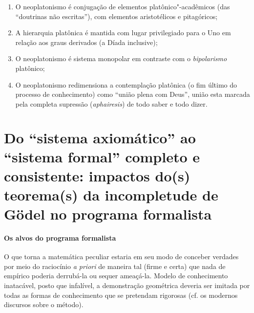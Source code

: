 {\begin{enumerate}
\item O neoplatonismo é conjugação de elementos
platônico"-acadêmicos (das “doutrinas não escritas”), com
elementos aristotélicos e pitagóricos;

\item A hierarquia platônica é mantida com lugar privilegiado para o
Uno em relação aos graus derivados (a Díada inclusive);

\item O neoplatonismo é sistema monopolar em contraste com o
\emph{bipolarismo} platônico;

\item O neoplatonismo redimensiona a contemplação platônica (o fim
último do processo de conhecimento) como “união plena com Deus”,
união esta marcada pela completa supressão (\emph{aphairesis})
de todo saber e todo dizer.
\end{enumerate}

\section{Do ``sistema
axiomático'' ao ``sistema
formal'' completo e consistente: impactos do(s)
teorema(s) da incompletude de Gödel no programa formalista}

\medskip\paragraph{Os alvos do programa formalista}

\let\subsection\paragraph

O que torna a matemática peculiar estaria em seu modo de
conceber verdades por meio do raciocínio \emph{a priori} de
maneira tal (firme e certa) que nada de empírico poderia
derrubá-la ou sequer ameaçá-la. Modelo de conhecimento
inatacável, posto que infalível, a demonstração geométrica
deveria ser imitada por todas as formas de conhecimento que se
pretendam rigorosas (cf. os modernos discursos sobre o método).

}

